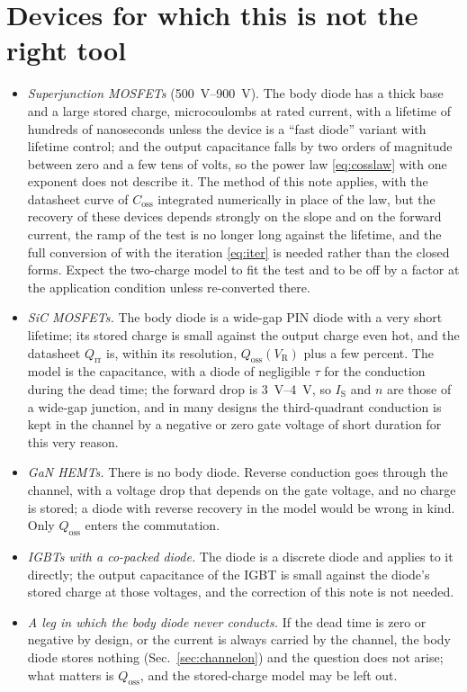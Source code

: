 \documentclass[10pt,a4paper]{scrartcl}
\newcommand{\VR}{V_\mathrm{R}}
\newcommand{\Qrr}{Q_\mathrm{rr}}
\newcommand{\Qoss}{Q_\mathrm{oss}}
\newcommand{\Coss}{C_\mathrm{oss}}
\newcommand{\IS}{I_\mathrm{S}}
\begin{document}
\section{Devices for which this is not the right tool}
\label{sec:limits}
\begin{itemize}
\item \emph{Superjunction MOSFETs} (\SIrange{500}{900}{\volt}). The body diode has a thick base and a large stored charge, microcoulombs at rated current, with a lifetime of hundreds of nanoseconds unless the device is a ``fast diode'' variant with lifetime control; and the output capacitance falls by two orders of magnitude between zero and a few tens of volts, so the power law \eqref{eq:cosslaw} with one exponent does not describe it. The method of this note applies, with the datasheet curve of $\Coss$ integrated numerically in place of the law, but the recovery of these devices depends strongly on the slope and on the forward current, the ramp of the test is no longer long against the lifetime, and the full conversion of \cite{lmnote} with the iteration \eqref{eq:iter} is needed rather than the closed forms. Expect the two-charge model to fit the test and to be off by a factor at the application condition unless re-converted there.
\item \emph{SiC MOSFETs.} The body diode is a wide-gap PIN diode with a very short lifetime; its stored charge is small against the output charge even hot, and the datasheet $\Qrr$ is, within its resolution, $\Qoss(\VR)$ plus a few percent. The model is the capacitance, with a diode of negligible $\tau$ for the conduction during the dead time; the forward drop is \SIrange{3}{4}{\volt}, so $\IS$ and $n$ are those of a wide-gap junction, and in many designs the third-quadrant conduction is kept in the channel by a negative or zero gate voltage of short duration for this very reason.
\item \emph{GaN HEMTs.} There is no body diode. Reverse conduction goes through the channel, with a voltage drop that depends on the gate voltage, and no charge is stored; a diode with reverse recovery in the model would be wrong in kind. Only $\Qoss$ enters the commutation.
\item \emph{IGBTs with a co-packed diode.} The diode is a discrete diode and \cite{lmnote} applies to it directly; the output capacitance of the IGBT is small against the diode's stored charge at those voltages, and the correction of this note is not needed.
\item \emph{A leg in which the body diode never conducts.} If the dead time is zero or negative by design, or the current is always carried by the channel, the body diode stores nothing (Sec.~\ref{sec:channelon}) and the question does not arise; what matters is $\Qoss$, and the stored-charge model may be left out.
\end{itemize}
\end{document}
